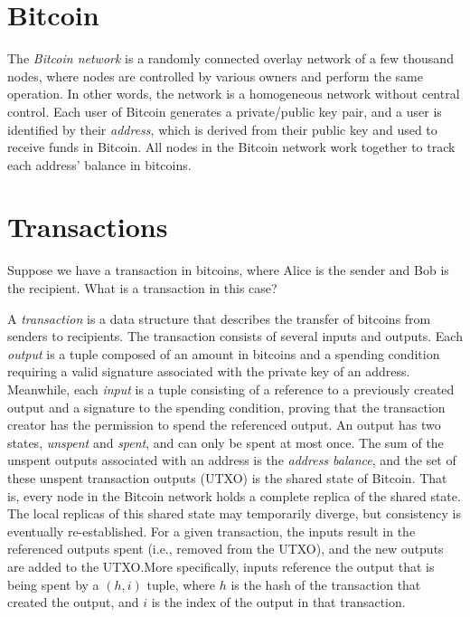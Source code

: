 \documentclass{article}
\begin{document}
\section{Bitcoin}

The \emph{Bitcoin network} is a randomly connected overlay network of a few
thousand nodes, where nodes are controlled by various owners and perform the
same operation. In other words, the network is a homogeneous network without
central control. Each user of Bitcoin generates a private/public key pair, and a
user is identified by their \emph{address}, which is derived from their public
key and used to receive funds in Bitcoin. All nodes in the Bitcoin network work
together to track each address' balance in bitcoins.

\section{Transactions}

Suppose we have a transaction in bitcoins, where Alice is the sender and Bob is
the recipient. What is a transaction in this case?

A \emph{transaction} is a data structure that describes the transfer of bitcoins
from senders to recipients. The transaction consists of several inputs and
outputs. Each \emph{output} is a tuple composed of an amount in bitcoins and a
spending condition requiring a valid signature associated with the private key
of an address. Meanwhile, each \emph{input} is a tuple consisting of a reference
to a previously created output and a signature to the spending condition,
proving that the transaction creator has the permission to spend the referenced
output. An output has two states, \emph{unspent} and \emph{spent}, and can only
be spent at most once. The sum of the unspent outputs associated with an address
is the \emph{address balance}, and the set of these unspent transaction outputs
(UTXO) is the shared state of Bitcoin. That is, every node in the Bitcoin
network holds a complete replica of the shared state. The local replicas of this
shared state may temporarily diverge, but consistency is eventually
re-established. For a given transaction, the inputs result in the referenced
outputs spent (i.e., removed from the UTXO), and the new outputs are added to
the UTXO.\@ More specifically, inputs reference the output that is being spent
by a $(h, i)$ tuple, where $h$ is the hash of the transaction that created the
output, and $i$ is the index of the output in that transaction.
\end{document}
